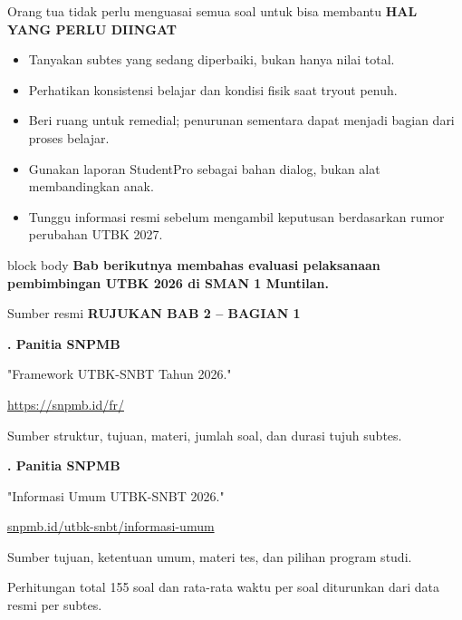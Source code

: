 \documentclass[aspectratio=169,11pt]{beamer}
\newcommand{\kicker}[1]{%
  {\color{StudentCyan}\bfseries\fontsize{10.5}{13}\selectfont\MakeUppercase{#1}}\par\vspace{0.11cm}
}
\begin{document}
\begin{frame}{Orang tua tidak perlu menguasai semua soal untuk bisa membantu}
  \kicker{Hal yang Perlu Diingat}
  \begin{itemize}
    \item Tanyakan subtes yang sedang diperbaiki, bukan hanya nilai total.
    \item Perhatikan konsistensi belajar dan kondisi fisik saat tryout penuh.
    \item Beri ruang untuk remedial; penurunan sementara dapat menjadi bagian dari proses belajar.
    \item Gunakan laporan StudentPro sebagai bahan dialog, bukan alat membandingkan anak.
    \item Tunggu informasi resmi sebelum mengambil keputusan berdasarkan rumor perubahan UTBK 2027.
  \end{itemize}
  \vspace{0.24cm}
  \begin{beamercolorbox}[rounded=true,sep=0.20cm,wd=\textwidth]{block body}
    \centering\bfseries Bab berikutnya membahas evaluasi pelaksanaan pembimbingan UTBK 2026 di SMAN 1 Muntilan.
  \end{beamercolorbox}
\end{frame}

\begin{frame}{Sumber resmi}
  \kicker{Rujukan Bab 2 -- Bagian 1}
  {\color{StudentBlue}\bfseries\fontsize{15}{18}. Panitia SNPMB}\par
  \vspace{0.06cm}
  {\fontsize{12.5}{15.5}\selectfont "Framework UTBK-SNBT Tahun 2026."}\par
  {\fontsize{11.5}{14}\selectfont\href{https://snpmb.id/fr/}{https://snpmb.id/fr/}}\par
  {\color{StudentGray}\fontsize{11}{13.5}\selectfont Sumber struktur, tujuan, materi, jumlah soal, dan durasi tujuh subtes.}\par
  \vspace{0.38cm}
  {\color{StudentBlue}\bfseries\fontsize{15}{18}. Panitia SNPMB}\par
  \vspace{0.06cm}
  {\fontsize{12.5}{15.5}\selectfont "Informasi Umum UTBK-SNBT 2026."}\par
  {\fontsize{11.2}{13.8}\selectfont\href{https://snpmb.id/utbk-snbt/informasi-umum}{snpmb.id/utbk-snbt/informasi-umum}}\par
  {\color{StudentGray}\fontsize{11}{13.5}\selectfont Sumber tujuan, ketentuan umum, materi tes, dan pilihan program studi.}\par
  \vspace{0.30cm}
  {\color{StudentGray}\fontsize{10.5}{13}\selectfont Perhitungan total 155 soal dan rata-rata waktu per soal diturunkan dari data resmi per subtes.}
\end{frame}
\end{document}
